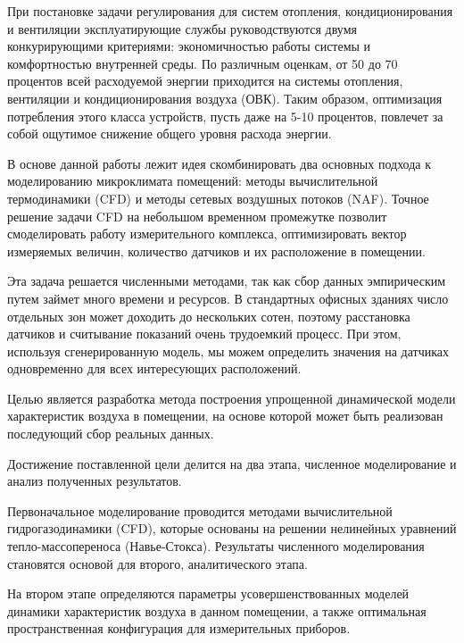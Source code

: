 
При постановке задачи регулирования для систем отопления, кондиционирования и вентиляции эксплуатирующие службы руководствуются двумя конкурирующими критериями: экономичностью работы системы и комфортностью внутренней среды. По различным оценкам, от 50 до 70 процентов всей расходуемой энергии приходится на системы отопления, вентиляции и кондиционирования воздуха (ОВК). Таким образом, оптимизация потребления этого класса устройств, пусть даже на 5-10 процентов, повлечет за собой ощутимое снижение общего уровня расхода энергии. 

В основе данной работы лежит идея скомбинировать два основных подхода к моделированию микроклимата помещений: методы вычислительной термодинамики (CFD) и методы сетевых воздушных потоков (NAF). Точное решение задачи CFD на небольшом временном промежутке позволит смоделировать работу измерительного комплекса, оптимизировать вектор измеряемых величин, количество датчиков и их расположение в помещении. 

Эта задача решается численными методами, так как сбор данных эмпирическим путем займет много времени и ресурсов. В стандартных офисных зданиях число отдельных зон может доходить до нескольких сотен, поэтому расстановка датчиков и считывание показаний очень трудоемкий процесс. При этом, используя сгенерированную модель, мы можем определить значения на датчиках одновременно для всех интересующих расположений.



\newpage
{}

Целью является разработка метода построения упрощенной динамической модели характеристик воздуха в помещении, на основе которой может быть реализован последующий сбор реальных данных. 

Достижение поставленной цели делится на два этапа, численное моделирование и анализ полученных результатов.

Первоначальное моделирование проводится методами вычислительной гидрогазодинамики (CFD), которые основаны на решении нелинейных уравнений тепло-массопереноса (Навье-Стокса). Результаты численного моделирования становятся основой для второго, аналитического этапа.

На втором этапе определяются параметры усовершенствованных моделей динамики характеристик воздуха в данном помещении, а также оптимальная пространственная конфигурация для измерительных приборов.